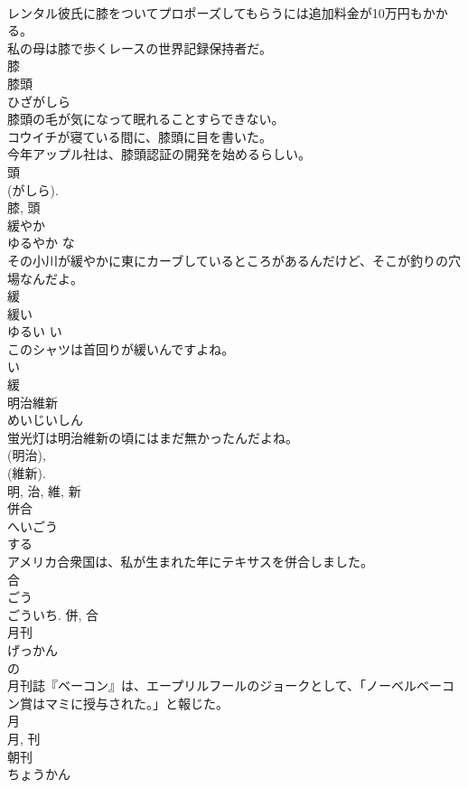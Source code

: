 \documentclass[8pt]{extreport}
\begin{document}
\begin{CJK}{UTF8}{min}
\\	レンタル彼氏に膝をついてプロポーズしてもらうには追加料金が10万円もかかる。	
\\	私の母は膝で歩くレースの世界記録保持者だ。	
\\	膝	
\\	膝頭	
\\	ひざがしら	
\\	膝頭の毛が気になって眠れることすらできない。	
\\	コウイチが寝ている間に、膝頭に目を書いた。	
\\	今年アップル社は、膝頭認証の開発を始めるらしい。	
\\	頭 
\\	(がしら). 
\\	膝, 頭	
\\	緩やか	
\\	ゆるやか	な 
\\	その小川が緩やかに東にカーブしているところがあるんだけど、そこが釣りの穴場なんだよ。	
\\	緩	
\\	緩い	
\\	ゆるい	い 
\\	このシャツは首回りが緩いんですよね。	
\\	い 
\\	緩	
\\	明治維新	
\\	めいじいしん	
\\	蛍光灯は明治維新の頃にはまだ無かったんだよね。	
\\	(明治), 
\\	(維新). 
\\	明, 治, 維, 新	
\\	併合	
\\	へいごう	
\\	する 
\\	アメリカ合衆国は、私が生まれた年にテキサスを併合しました。	
\\	合 
\\	ごう 
\\	ごういち.	併, 合	
\\	月刊	
\\	げっかん	
\\	の 
\\	月刊誌『ベーコン』は、エープリルフールのジョークとして、「ノーベルベーコン賞はマミに授与された。」と報じた。	
\\	月 
\\	月, 刊	
\\	朝刊	
\\	ちょうかん	

\end{CJK}
\end{document}
